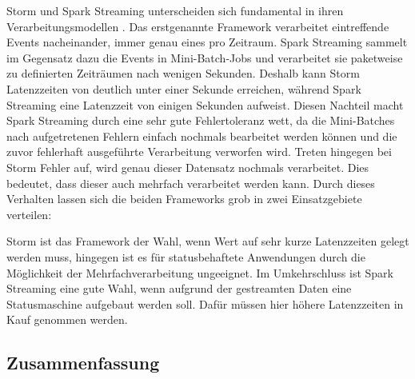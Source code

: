Storm und Spark Streaming unterscheiden sich fundamental in ihren Verarbeitungsmodellen . Das erstgenannte Framework verarbeitet eintreffende Events nacheinander, immer genau eines pro Zeitraum. Spark Streaming sammelt im Gegensatz dazu die Events in Mini-Batch-Jobs und verarbeitet sie paketweise zu definierten Zeiträumen nach wenigen Sekunden. Deshalb kann Storm Latenzzeiten von deutlich unter einer Sekunde erreichen, während Spark Streaming eine Latenzzeit von einigen Sekunden aufweist. Diesen Nachteil macht Spark Streaming durch eine sehr gute Fehlertoleranz wett, da die Mini-Batches nach aufgetretenen Fehlern einfach nochmals bearbeitet werden können und die zuvor fehlerhaft ausgeführte Verarbeitung verworfen wird. Treten hingegen bei Storm Fehler auf, wird genau dieser Datensatz nochmals verarbeitet. Dies bedeutet, dass dieser auch mehrfach verarbeitet werden kann. Durch dieses Verhalten lassen sich die beiden Frameworks grob in zwei Einsatzgebiete verteilen:

Storm ist das Framework der Wahl, wenn Wert auf sehr kurze Latenzzeiten gelegt werden muss, hingegen ist es für statusbehaftete Anwendungen durch die Möglichkeit der Mehrfachverarbeitung ungeeignet. Im Umkehrschluss ist Spark Streaming eine gute Wahl, wenn aufgrund der gestreamten Daten eine Statusmaschine aufgebaut werden soll. Dafür müssen hier höhere Latenzzeiten in Kauf genommen werden.     

\subsection{Zusammenfassung}
\label{section:storm}


